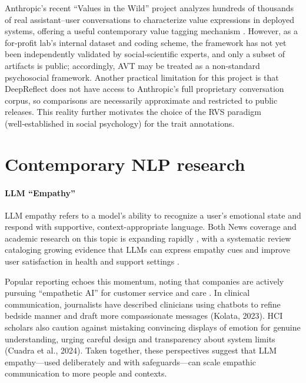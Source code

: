 Anthropic’s recent “Values in the Wild” project analyzes hundreds of thousands of real assistant–user conversations to characterize value expressions in deployed systems, offering a useful contemporary value tagging mechanism \cite{values-in-wild}. However, as a for‑profit lab’s internal dataset and coding scheme, the framework has not yet been independently validated by social‑scientific experts, and only a subset of artifacts is public; accordingly, AVT may be treated as a non-standard psychosocial framework. Another practical limitation for this project is that DeepReflect does not have access to Anthropic’s full proprietary conversation corpus, so comparisons are necessarily approximate and restricted to public releases. This reality further motivates the choice of the RVS paradigm (well‑established in social psychology) for the trait annotations.



\section{Contemporary NLP research}
\paragraph{LLM ``Empathy''}

LLM empathy refers to a model’s ability to recognize a user’s emotional state and respond with supportive, context-appropriate language. Both News coverage and academic research on this topic is expanding rapidly \cite{guardian2025-chatgpt-conversation,empathy-bedside, empathy-illusion}, with a systematic review cataloging growing evidence that LLMs can express empathy cues and improve user satisfaction in health and support settings \cite{sorin-etal-empathy}.

 Popular reporting echoes this momentum, noting that companies are actively pursuing “empathetic AI” for customer service and care \cite{empathy-ai}. In clinical communication, journalists have described clinicians using chatbots to refine bedside manner and draft more compassionate messages (Kolata, 2023). HCI scholars also caution against mistaking convincing displays of emotion for genuine understanding, urging careful design and transparency about system limits (Cuadra et al., 2024). Taken together, these perspectives suggest that LLM empathy—used deliberately and with safeguards—can scale empathic communication to more people and contexts.

